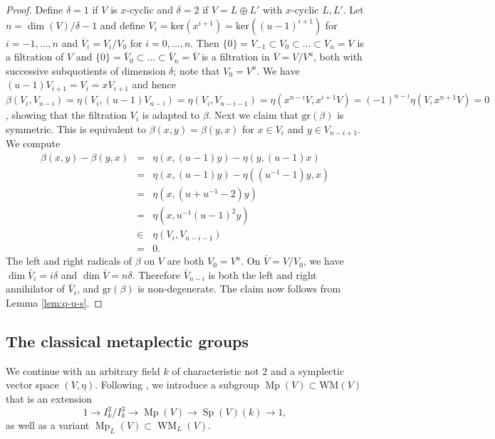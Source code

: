 \documentclass{article}
\def\tx#1{\textrm{#1}}
\def\ol#1{\overline{#1}}
\DeclareMathOperator{\Sp}{Sp}
\theoremstyle{definition}
\numberwithin{equation}{subsection}
\renewcommand{\-}{\hyp{}}
\DeclareMathOperator{\Mp}{Mp}
\DeclareMathOperator{\WM}{WM}
\newcommand{\WMuniv}{\mathrm{WM}}
\begin{document}
\begin{appendices}
\begin{proof}
	Define $\delta=1$ if $V$ is $x$-cyclic and $\delta=2$ if $V=L \oplus L'$ with $x$-cyclic $L,L'$. Let $n=\dim(V)/\delta-1$ and define $V_i=\tx{ker}(x^{i+1})=\tx{ker}((u-1)^{i+1})$ for $i=-1,\dots,n$ and $\ol{V}_i=V_i/V_0$ for $i=0,\dots,n$. Then $\{0\}=V_{-1}\subset V_0 \subset \dots \subset V_n=V$ is a filtration of $V$ and $\{0\}=\ol{V}_0 \subset \dots \subset \ol{V}_n=\ol{V}$ is a filtration in $\ol{V}=V/V^u$, both with successive subquotients of dimension $\delta$; note that $V_0=V^u$. We have $(u-1)V_{i+1}=V_i=xV_{i+1}$ and hence $\beta(V_i,V_{n-i})=\eta(V_i,(u-1)V_{n-i})=\eta(V_i,V_{n-i-1})=\eta(x^{n-i}V,x^{i+1}V)=(-1)^{n-i}\eta(V,x^{n+1}V)=0$, showing that the filtration $V_i$ is adapted to $\beta$. Next we claim that $\tx{gr}(\beta)$ is symmetric. This is equivalent to $\beta(x,y)=\beta(y,x)$ for $x \in V_i$ and $y \in V_{n-i+1}$. We compute
	\begin{eqnarray*}
		\beta(x,y)-\beta(y,x)&=&\eta(x,(u-1)y)-\eta(y,(u-1)x)\\
		&=&\eta(x,(u-1)y)-\eta((u^{-1}-1)y,x)\\
		&=&\eta(x,(u+u^{-1}-2)y)\\
		&=&\eta(x,u^{-1}(u-1)^2y)\\
		&\in&\eta(V_i,V_{n-i-1})\\
		&=&0.
	\end{eqnarray*}
	The left and right radicals of $\beta$ on $V$ are both $V_0=V^u$. On $\bar V=V/V_0$, we have $\dim\bar V_i=i\delta$ and $\dim\bar V=n\delta$. Therefore  $\bar V_{n-i}$ is both the left and right annihilator of $\bar V_i$, and $\tx{gr}(\beta)$ is non-degenerate. The claim now follows from Lemma \ref{lem:q-u-s}.	
\end{proof}


\subsection{The classical metaplectic groups} \label{sub:classmeta}

We continue with an arbitrary field $k$ of characteristic not $2$ and a symplectic vector space $(V,\eta)$. Following \cite{Thomas2013}, we introduce a subgroup $\Mp(V) \subset \WMuniv(V)$ that is an extension 
\[ 1 \to I_k^2/I_k^3 \to \Mp(V) \to \Sp(V)(k) \to 1, \]
as well as a variant $\Mp_L(V) \subset \WM_L(V)$. 



\end{appendices}
\end{document}
